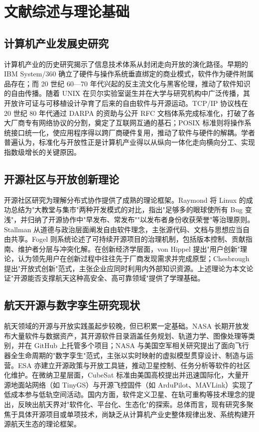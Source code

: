 \documentclass[UTF8,a4paper,zihao=-4]{ctexart}
\begin{document}
\section{文献综述与理论基础}
\subsection{计算机产业发展史研究}
计算机产业的历史研究揭示了信息技术体系从封闭走向开放的演化路径。早期的 IBM System/360 确立了硬件与操作系统垂直绑定的商业模式，软件作为硬件附属品存在；而 20 世纪 60—70 年代兴起的反主流文化与黑客伦理，推动了软件知识的自由传播。随着 UNIX 在贝尔实验室诞生并在大学与研究机构中广泛传播，其开放许可证与可移植设计孕育了后来的自由软件与开源运动\cite{levy1984,raymond1999}。TCP/IP 协议栈在 20 世纪 80 年代通过 DARPA 的资助与公开 RFC 文档体系完成标准化，打破了各大厂商专有网络协议的分割，奠定了互联网互通的基石；POSIX 标准则将操作系统接口统一化\cite{rfc2026,posix2017}，使应用程序得以跨厂商硬件复用，推动了软件与硬件的解耦。学者普遍认为，标准化与开放性正是计算机产业得以从纵向一体化走向横向分工、实现指数级增长的关键原因。

\subsection{开源社区与开放创新理论}
开源社区研究为理解分布式协作提供了成熟的理论框架。Raymond 将 Linux 的成功总结为"大教堂与集市"两种开发模式的对比，指出"足够多的眼球使所有 Bug 变浅"，并归纳了开源协作中"早发布、常发布""以发布者身份收获荣誉"等治理原则\cite{raymond1999}。Stallman 从道德与政治层面阐发自由软件理念，主张源代码、文档与思想应当自由共享\cite{stallman1985}。Fogel 则系统论述了可持续开源项目的治理机制，包括版本控制、贡献指南、维护者分层与冲突化解\cite{fogel2005}。在创新经济学层面，von Hippel 提出"用户创新"理论，认为领先用户在创新过程中往往先于厂商发现需求并完成原型\cite{vonhippel2005}；Chesbrough 提出"开放式创新"范式，主张企业应同时利用内外部知识资源\cite{chesbrough2003}。上述理论为本文论证"开源能否支撑航天这种高安全、高可靠领域"提供了学理基础。

\subsection{航天开源与数字孪生研究现状}
航天领域的开源与开放实践虽起步较晚，但已积累一定基础。NASA 长期开放发布大量软件与数据资产，其开源软件目录涵盖任务规划、轨道力学、图像处理等类别，并在 GitHub 上托管多个项目\cite{nasa}；NASA 与美国空军相关研究提出了面向飞行器全生命周期的"数字孪生"范式\cite{glaessgen2012,grieves2017}，主张以实时映射的虚拟模型贯穿设计、制造与运营。ESA 亦建立开源政策与开放工具链，推动卫星控制、任务分析等软件的社区化维护\cite{esa}。在微纳卫星层面，CubeSat 标准由美国高校提出并迅速国际化\cite{puig2001}，大量开源地面站网络（如 TinyGS）与开源飞控固件（如 ArduPilot、MAVLink）实现了低成本参与低轨空间活动\cite{tinygs,ardupilot,mavlink}。国内方面，软件定义卫星、在轨可重构等技术理念的提出\cite{xufanjiang2023}，反映出航天界对"软件化、平台化、生态化"的探索。总体而言，现有研究多聚焦于具体开源项目或单项技术，尚缺乏从计算机产业史整体规律出发、系统构建开源航天生态的理论框架。
\end{document}
